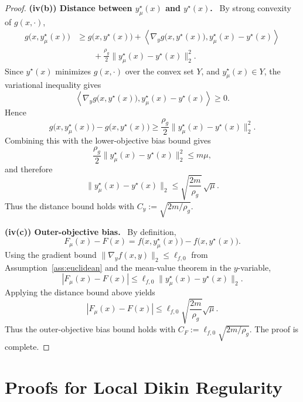 \documentclass{article}
\newcommand{\proofstep}[1]{\par\smallskip\noindent\textbf{#1}\ }
\begin{document}
\begin{proof}
\proofstep{(iv(b)) Distance between \(y_\mu^\star(x)\) and \(y^\star(x)\).}
By strong convexity of \(g(x,\cdot)\),
\begin{align*}
g\bigl(x,y_\mu^\star(x)\bigr)
&\ge
g\bigl(x,y^\star(x)\bigr)
+
\left\langle
\nabla_y g\bigl(x,y^\star(x)\bigr),
y_\mu^\star(x)-y^\star(x)
\right\rangle  \\
&\qquad
+
\frac{\rho_g}{2}
\|y_\mu^\star(x)-y^\star(x)\|_2^2.
\end{align*}
Since \(y^\star(x)\) minimizes \(g(x,\cdot)\) over the convex set \(Y\), and
\(y_\mu^\star(x)\in Y\), the variational inequality gives
\begin{equation*}
\left\langle
\nabla_y g\bigl(x,y^\star(x)\bigr),
y_\mu^\star(x)-y^\star(x)
\right\rangle
\ge 0.
\end{equation*}
Hence
\begin{equation*}
g\bigl(x,y_\mu^\star(x)\bigr)-g\bigl(x,y^\star(x)\bigr)
\ge
\frac{\rho_g}{2}\|y_\mu^\star(x)-y^\star(x)\|_2^2.
\end{equation*}
Combining this with the lower-objective bias bound gives
\begin{equation*}
\frac{\rho_g}{2}\|y_\mu^\star(x)-y^\star(x)\|_2^2
\le
m\mu,
\end{equation*}
and therefore
\begin{equation*}
\|y_\mu^\star(x)-y^\star(x)\|_2
\le
\sqrt{\frac{2m}{\rho_g}}\,\sqrt{\mu}.
\end{equation*}
Thus the distance bound holds with \(C_y:=\sqrt{2m/\rho_g}\).

\proofstep{(iv(c)) Outer-objective bias.}
By definition,
\begin{equation*}
F_\mu(x)-F(x)
=
f\bigl(x,y_\mu^\star(x)\bigr)-f\bigl(x,y^\star(x)\bigr).
\end{equation*}
Using the gradient bound \(\|\nabla_y f(x,y)\|_2\le \ell_{f,0}\) from
Assumption~\ref{ass:euclidean} and the mean-value theorem in the \(y\)-variable,
\begin{equation*}
|F_\mu(x)-F(x)|
\le
\ell_{f,0}
\|y_\mu^\star(x)-y^\star(x)\|_2.
\end{equation*}
Applying the distance bound above yields
\begin{equation*}
|F_\mu(x)-F(x)|
\le
\ell_{f,0}\sqrt{\frac{2m}{\rho_g}}\sqrt{\mu}.
\end{equation*}
Thus the outer-objective bias bound holds with
\(C_F:=\ell_{f,0}\sqrt{2m/\rho_g}\). The proof is complete.
\end{proof}

\section{Proofs for Local Dikin Regularity}
\label{app:dikin_regularity}
\end{document}
